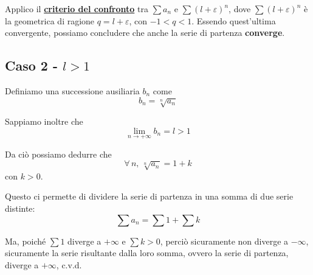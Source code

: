 \documentclass[../../analisi1]{subfiles}
\begin{document}
                Applico il \textbf{\hyperref[serieconfronto]{criterio del confronto}} tra \(\sum a_n\) e \(\sum(l + \varepsilon)^n\),
                dove \(\sum(l + \varepsilon)^n\) è la geometrica di ragione \(q = l + \varepsilon\), con \(-1 < q < 1\).
                Essendo quest'ultima convergente, possiamo concludere che anche la serie di partenza \textbf{converge}.

            \subsection*{Caso 2 - \(l > 1\)}

                Definiamo una successione ausiliaria \(b_n\) come
                \[ b_n = \sqrt[n]{a_n} \]

                Sappiamo inoltre che
                \[ \lim_{n \to +\infty}b_n = l > 1 \]

                Da ciò possiamo dedurre che
                \[\forall \, n , \, \sqrt[n]{a_n} = 1 + k\]
                con \(k > 0\).

                Questo ci permette di dividere la serie di partenza in una somma di due serie distinte:
                \[\sum a_n = \sum 1 + \sum k\]

                Ma, poiché \(\sum 1\) diverge a \(+ \infty\) e \(\sum k > 0\), perciò sicuramente non diverge a \(- \infty\),
                sicuramente la serie risultante dalla loro somma, ovvero la serie di partenza, diverge a \(+ \infty\), c.v.d.
\end{document}
